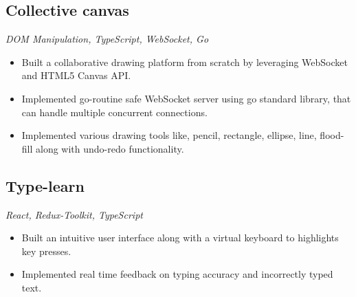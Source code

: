 \documentclass[a4paper]{article}
\begin{document}
\subsection{Collective canvas}
\textit{DOM Manipulation, TypeScript, WebSocket, Go}
\hfill
\href{https://collective-canvas.netlify.app/}{ \faLink }
\href{https://github.com/jatinkumar-me/collective-canvas.git}{ \faCode}
\href{https://github.com/jatinkumar-me/cc-server}{ \faCode}
\begin{itemize}
    \item Built a collaborative drawing platform from scratch by leveraging WebSocket and HTML5 Canvas API. 
    \item Implemented go-routine safe WebSocket server using go standard library, that can handle multiple concurrent connections.
    \item Implemented various drawing tools like, pencil, rectangle, ellipse, line, flood-fill along with undo-redo functionality.
\end{itemize}

\subsection{Type-learn}
\textit{React, Redux-Toolkit, TypeScript}
\hfill
\href{https://type-learn.netlify.app/}{ \faLink }
\textbar
\href{https://github.com/jatinkumar-me/type-learn}{ \faCode}
\begin{itemize}
	\item Built an intuitive user interface along with a virtual keyboard to highlights key presses.
	\item Implemented real time feedback on typing accuracy and incorrectly typed text.
\end{itemize}

\end{document}
